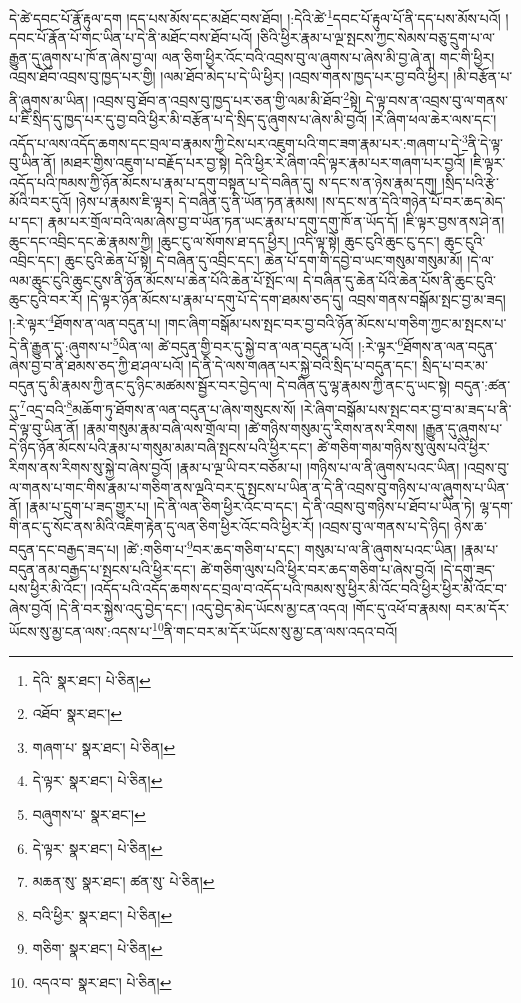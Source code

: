 དེ་ཚེ་དབང་པོ་རྣོ་རྟུལ་དག །དད་པས་མོས་དང་མཐོང་བས་ཐོབ། །:དེའི་ཚེ་\footnote{དེའི་  སྣར་ཐང་།  པེ་ཅིན། }དབང་པོ་རྟུལ་པོ་ནི་དད་པས་མོས་པའོ། །དབང་པོ་རྣོན་པོ་གང་ཡིན་པ་དེ་ནི་མཐོང་བས་ཐོབ་པའོ། །ཅིའི་ཕྱིར་རྣམ་པ་ལྔ་སྤངས་ཀྱང་སེམས་བཅུ་དྲུག་པ་ལ་རྒྱུན་དུ་ཞུགས་པ་ཁོ་ན་ཞེས་བྱ་ལ། ལན་ཅིག་ཕྱིར་འོང་བའི་འབྲས་བུ་ལ་ཞུགས་པ་ཞེས་མི་བྱ་ཞེ་ན། གང་གི་ཕྱིར། འབྲས་ཐོབ་འབྲས་བུ་ཁྱད་པར་གྱི། །ལམ་ཐོབ་མེད་པ་དེ་ཡི་ཕྱིར། །འབྲས་གནས་ཁྱད་པར་བྱ་བའི་ཕྱིར། །མི་བརྩོན་པ་ནི་ཞུགས་མ་ཡིན། །འབྲས་བུ་ཐོབ་ན་འབྲས་བུ་ཁྱད་པར་ཅན་གྱི་ལམ་མི་ཐོབ་\footnote{འཐོབ་  སྣར་ཐང་། }སྟེ། དེ་ལྟ་བས་ན་འབྲས་བུ་ལ་གནས་པ་ཇི་སྲིད་དུ་ཁྱད་པར་དུ་བྱ་བའི་ཕྱིར་མི་བརྩོན་པ་དེ་སྲིད་དུ་ཞུགས་པ་ཞེས་མི་བྱའོ། །རེ་ཞིག་ཕལ་ཆེར་ལས་དང་། འདོད་པ་ལས་འདོད་ཆགས་དང་བྲལ་བ་རྣམས་ཀྱི་ངེས་པར་འཇུག་པའི་གང་ཟག་རྣམ་པར་:གཞག་པ་དེ་\footnote{གཞག་པ་  སྣར་ཐང་།  པེ་ཅིན། }ནི་དེ་ལྟ་བུ་ཡིན་ནོ། །མཐར་གྱིས་འཇུག་པ་བརྗོད་པར་བྱ་སྟེ། དེའི་ཕྱིར་རེ་ཞིག་འདི་ལྟར་རྣམ་པར་གཞག་པར་བྱའོ། །ཇི་ལྟར་འདོད་པའི་ཁམས་ཀྱི་ཉོན་མོངས་པ་རྣམ་པ་དགུ་བསྟན་པ་དེ་བཞིན་དུ། ས་དང་ས་ན་ཉེས་རྣམ་དགུ། །སྲིད་པའི་རྩེ་མོའི་བར་དུའོ། །ཉེས་པ་རྣམས་ཇི་ལྟར། དེ་བཞིན་དུ་ནི་ཡོན་ཏན་རྣམས། །ས་དང་ས་ན་དེའི་གཉེན་པོ་བར་ཆད་མེད་པ་དང་། རྣམ་པར་གྲོལ་བའི་ལམ་ཞེས་བྱ་བ་ཡོན་ཏན་ཡང་རྣམ་པ་དགུ་དགུ་ཁོ་ན་ཡོད་དོ། །ཇི་ལྟར་བྱས་ནས་ཤེ་ན། ཆུང་དང་འབྲིང་དང་ཆེ་རྣམས་ཀྱི། །ཆུང་ངུ་ལ་སོགས་ཐ་དད་ཕྱིར། །འདི་ལྟ་སྟེ། ཆུང་ངུའི་ཆུང་ངུ་དང་། ཆུང་ངུའི་འབྲིང་དང་། ཆུང་ངུའི་ཆེན་པོ་སྟེ། དེ་བཞིན་དུ་འབྲིང་དང་། ཆེན་པོ་དག་གི་དབྱེ་བ་ཡང་གསུམ་གསུམ་མོ། །དེ་ལ་ལམ་ཆུང་ངུའི་ཆུང་ངུས་ནི་ཉོན་མོངས་པ་ཆེན་པོའི་ཆེན་པོ་སྤོང་ལ། དེ་བཞིན་དུ་ཆེན་པོའི་ཆེན་པོས་ནི་ཆུང་ངུའི་ཆུང་ངུའི་བར་རོ། །དེ་ལྟར་ཉོན་མོངས་པ་རྣམ་པ་དགུ་པོ་དེ་དག་ཐམས་ཅད་དུ། འབྲས་གནས་བསྒོམ་སྤང་བྱ་མ་ཟད། །:རེ་ལྟར་\footnote{དེ་ལྟར་  སྣར་ཐང་།  པེ་ཅིན། }ཐོགས་ན་ལན་བདུན་པ། །གང་ཞིག་བསྒོམ་པས་སྤང་བར་བྱ་བའི་ཉོན་མོངས་པ་གཅིག་ཀྱང་མ་སྤངས་པ་དེ་ནི་རྒྱུན་དུ་:ཞུགས་པ་\footnote{བཞུགས་པ་  སྣར་ཐང་། }ཡིན་ལ། ཚེ་བདུན་གྱི་བར་དུ་སྐྱེ་བ་ན་ལན་བདུན་པའོ། །:རེ་ལྟར་\footnote{དེ་ལྟར་  སྣར་ཐང་།  པེ་ཅིན། }ཐོགས་ན་ལན་བདུན་ཞེས་བྱ་བ་ནི་ཐམས་ཅད་ཀྱི་ཐ་ཤལ་པའོ། །དེ་ནི་དེ་ལས་གཞན་པར་སྐྱེ་བའི་སྲིད་པ་བདུན་དང་། སྲིད་པ་བར་མ་བདུན་དུ་མི་རྣམས་ཀྱི་ནང་དུ་ཉིང་མཚམས་སྦྱོར་བར་བྱེད་ལ། དེ་བཞིན་དུ་ལྷ་རྣམས་ཀྱི་ནང་དུ་ཡང་སྟེ། བདུན་:ཚན་དུ་\footnote{མཆན་སུ་  སྣར་ཐང་། ཚན་སུ་  པེ་ཅིན། }འདྲ་བའི་\footnote{བའི་ཕྱིར་  སྣར་ཐང་།  པེ་ཅིན། }མཆོག་ཏུ་ཐོགས་ན་ལན་བདུན་པ་ཞེས་གསུངས་སོ། །རེ་ཞིག་བསྒོམ་པས་སྤང་བར་བྱ་བ་མ་ཟད་པ་ནི་དེ་ལྟ་བུ་ཡིན་ནོ། །རྣམ་གསུམ་རྣམ་བཞི་ལས་གྲོལ་བ། །ཚེ་གཉིས་གསུམ་དུ་རིགས་ནས་རིགས། །རྒྱུན་དུ་ཞུགས་པ་དེ་ཉིད་ཉོན་མོངས་པའི་རྣམ་པ་གསུམ་མམ་བཞི་སྤངས་པའི་ཕྱིར་དང་། ཚེ་གཅིག་གམ་གཉིས་སུ་ལུས་པའི་ཕྱིར་རིགས་ནས་རིགས་སུ་སྐྱེ་བ་ཞེས་བྱའོ། །རྣམ་པ་ལྔ་ཡི་བར་བཅོམ་པ། །གཉིས་པ་ལ་ནི་ཞུགས་པའང་ཡིན། །འབྲས་བུ་ལ་གནས་པ་གང་གིས་རྣམ་པ་གཅིག་ནས་ལྔའི་བར་དུ་སྤངས་པ་ཡིན་ན་དེ་ནི་འབྲས་བུ་གཉིས་པ་ལ་ཞུགས་པ་ཡིན་ནོ། །རྣམ་པ་དྲུག་པ་ཟད་གྱུར་པ། །དེ་ནི་ལན་ཅིག་ཕྱིར་འོང་བ་དང་། དེ་ནི་འབྲས་བུ་གཉིས་པ་ཐོབ་པ་ཡིན་ཏེ། ལྷ་དག་གི་ནང་དུ་སོང་ནས་མིའི་འཇིག་རྟེན་དུ་ལན་ཅིག་ཕྱིར་འོང་བའི་ཕྱིར་རོ། །འབྲས་བུ་ལ་གནས་པ་དེ་ཉིད། ཉེས་ཆ་བདུན་དང་བརྒྱད་ཟད་པ། །ཚེ་:གཅིག་པ་\footnote{གཅིག་  སྣར་ཐང་།  པེ་ཅིན། }བར་ཆད་གཅིག་པ་དང་། གསུམ་པ་ལ་ནི་ཞུགས་པའང་ཡིན། །རྣམ་པ་བདུན་ནམ་བརྒྱད་པ་སྤངས་པའི་ཕྱིར་དང་། ཚེ་གཅིག་ལུས་པའི་ཕྱིར་བར་ཆད་གཅིག་པ་ཞེས་བྱའོ། །དེ་དགུ་ཟད་པས་ཕྱིར་མི་འོང་། །འདོད་པའི་འདོད་ཆགས་དང་བྲལ་བ་འདོད་པའི་ཁམས་སུ་ཕྱིར་མི་འོང་བའི་ཕྱིར་ཕྱིར་མི་འོང་བ་ཞེས་བྱའོ། །དེ་ནི་བར་སྐྱེས་འདུ་བྱེད་དང་། །འདུ་བྱེད་མེད་ཡོངས་མྱ་ངན་འདའ། །གོང་དུ་འཕོ་བ་རྣམས། བར་མ་དོར་ཡོངས་སུ་མྱ་ངན་ལས་:འདས་པ་\footnote{འདའ་བ་  སྣར་ཐང་།  པེ་ཅིན། }ནི་གང་བར་མ་དོར་ཡོངས་སུ་མྱ་ངན་ལས་འདའ་བའོ། 